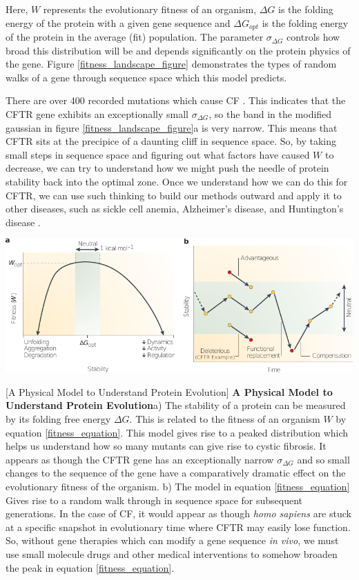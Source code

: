 Here, $W$ represents the evolutionary fitness of an organism, $\Delta G$ is the folding energy of the protein with a given gene sequence and $\Delta G_{opt}$ is the folding energy of the protein in the average (fit) population. The parameter $\sigma_{\Delta G}$ controls how broad this distribution will be and depends significantly on the protein physics of the gene. Figure \ref{fitness_landscape_figure} demonstrates the types of random walks of a gene through sequence space which this model predicts. 

There are over 400 recorded mutations which cause CF \cite{cftr2}. This indicates that  the CFTR gene exhibits an exceptionally small $\sigma_{\Delta G}$, so the band in the modified gaussian in figure \ref{fitness_landscape_figure}a is very narrow. This means that CFTR sits at the precipice of a daunting cliff in sequence space.  So, by taking small steps in sequence space and figuring out what factors have caused $W$ to decrease, we can try to understand how we might push the needle of protein stability back into the optimal zone. Once we understand how we can do this for CFTR, we can use such thinking to build our methods outward and apply it to other diseases, such as sickle cell anemia, Alzheimer's disease, and Huntington's disease \cite{depristo2005}.

	\begin{center}
		\includegraphics[width=1.0\textwidth]{figures/fitness_landscape_fig.pdf}
	\end{center}
	\begingroup
	\captionsetup{singlelinecheck = false, justification=raggedright}
	[A Physical Model to Understand Protein Evolution] {\textbf{A Physical Model to Understand Protein Evolution}}{a) The stability of a protein can be measured by its folding free energy $\Delta G$. This is related to the fitness of an organism $W$ by equation \ref{fitness_equation}. This model gives rise to a peaked distribution which helps us understand how so many mutants can give rise to cystic fibrosis. It appears as though the CFTR gene has an exceptionally narrow $\sigma_{\Delta G}$ and so small changes to the sequence of the gene have a comparatively dramatic effect on the evolutionary fitness of the organism. b) The model in equation \ref{fitness_equation} Gives rise to a random walk through in sequence space for subsequent generations. In the case of CF, it would appear as though \textit{homo sapiens} are stuck at a specific snapshot in evolutionary time where CFTR may easily lose function. So, without gene therapies which can modify a gene sequence \textit {in vivo}, we must use small molecule drugs and other medical interventions to somehow broaden the peak in equation \ref{fitness_equation}.}
	\label{fitness_landscape_figure}
\endgroup

